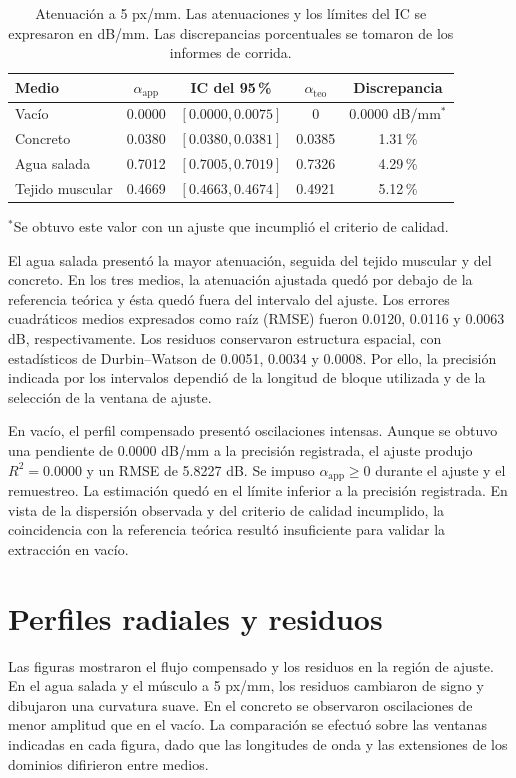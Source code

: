 \begin{table}[htbp]\centering\small
\caption{Atenuación a 5 px/mm. Las atenuaciones y los límites del IC se expresaron en dB/mm. Las discrepancias porcentuales se tomaron de los informes de corrida.}\label{tab:fdtd-base}
\begin{tabular}{lcccc}\hline
Medio & $\alpha_{\mathrm{app}}$ & IC del 95\,\% & $\alpha_{\mathrm{teo}}$ & Discrepancia \\ \hline
Vacío & 0.0000 & $[0.0000,0.0075]$ & 0 & $0.0000$ dB/mm$^{*}$ \\
Concreto & 0.0380 & $[0.0380,0.0381]$ & 0.0385 & 1.31\,\% \\
Agua salada & 0.7012 & $[0.7005,0.7019]$ & 0.7326 & 4.29\,\% \\
Tejido muscular & 0.4669 & $[0.4663,0.4674]$ & 0.4921 & 5.12\,\% \\ \hline
\end{tabular}
\par\smallskip\footnotesize $^{*}$Se obtuvo este valor con un ajuste que incumplió el criterio de calidad.
\end{table}

El agua salada presentó la mayor atenuación, seguida del tejido muscular y del concreto. En los tres medios, la atenuación ajustada quedó por debajo de la referencia teórica y ésta quedó fuera del intervalo del ajuste. Los errores cuadráticos medios expresados como raíz (RMSE) fueron 0.0120, 0.0116 y 0.0063 dB, respectivamente. Los residuos conservaron estructura espacial, con estadísticos de Durbin--Watson de 0.0051, 0.0034 y 0.0008. Por ello, la precisión indicada por los intervalos dependió de la longitud de bloque utilizada y de la selección de la ventana de ajuste.

En vacío, el perfil compensado presentó oscilaciones intensas. Aunque se obtuvo una pendiente de 0.0000 dB/mm a la precisión registrada, el ajuste produjo $R^2=0.0000$ y un RMSE de 5.8227 dB. Se impuso $\alpha_{\mathrm{app}}\geq 0$ durante el ajuste y el remuestreo. La estimación quedó en el límite inferior a la precisión registrada. En vista de la dispersión observada y del criterio de calidad incumplido, la coincidencia con la referencia teórica resultó insuficiente para validar la extracción en vacío.

\section{Perfiles radiales y residuos}
Las figuras mostraron el flujo compensado y los residuos en la región de ajuste. En el agua salada y el músculo a 5 px/mm, los residuos cambiaron de signo y dibujaron una curvatura suave. En el concreto se observaron oscilaciones de menor amplitud que en el vacío. La comparación se efectuó sobre las ventanas indicadas en cada figura, dado que las longitudes de onda y las extensiones de los dominios difirieron entre medios.

